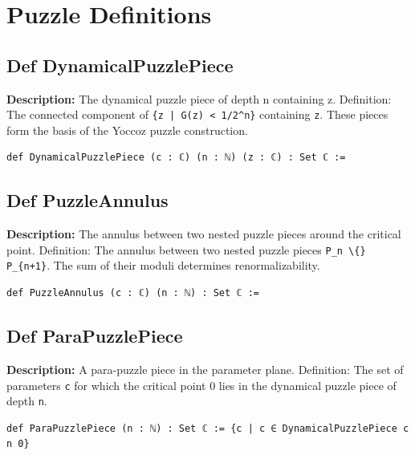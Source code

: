 \section{Puzzle Definitions}

\subsection*{Def DynamicalPuzzlePiece}
\textbf{Description:} The dynamical puzzle piece of depth n containing z.
    Definition: The connected component of \texttt{\{z | G(z) < 1/2\^{}n\}} containing \texttt{z}.
    These pieces form the basis of the Yoccoz puzzle construction.

\begin{lstlisting}[language=Lean]
def DynamicalPuzzlePiece (c : ℂ) (n : ℕ) (z : ℂ) : Set ℂ :=
\end{lstlisting}

\subsection*{Def PuzzleAnnulus}
\textbf{Description:} The annulus between two nested puzzle pieces around the critical point.
    Definition: The annulus between two nested puzzle pieces \texttt{P\_n \textbackslash\{\} P\_\{n+1\}}.
    The sum of their moduli determines renormalizability.

\begin{lstlisting}[language=Lean]
def PuzzleAnnulus (c : ℂ) (n : ℕ) : Set ℂ :=
\end{lstlisting}

\subsection*{Def ParaPuzzlePiece}
\textbf{Description:} A para-puzzle piece in the parameter plane.
    Definition: The set of parameters \texttt{c} for which the critical point 0 lies in the
    dynamical puzzle piece of depth \texttt{n}.

\begin{lstlisting}[language=Lean]
def ParaPuzzlePiece (n : ℕ) : Set ℂ := {c | c ∈ DynamicalPuzzlePiece c n 0}
\end{lstlisting}


